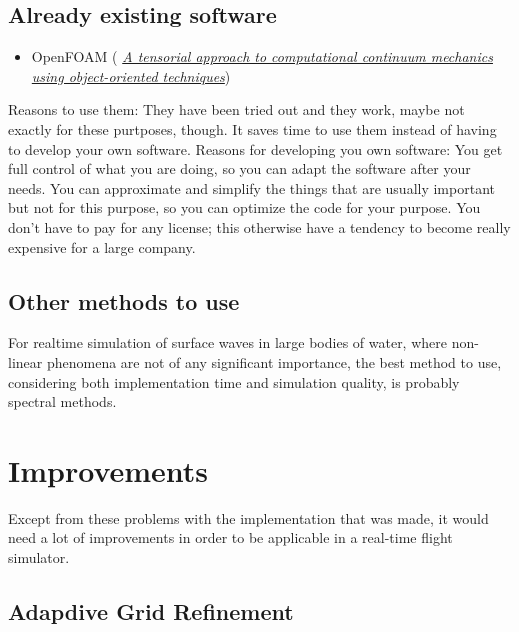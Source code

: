\section{Already existing software}

\begin{itemize}
    \item OpenFOAM ( \textit{\href{http://powerlab.fsb.hr/ped/kturbo/openfoam/docs/foam.pdf}{A tensorial approach to computational continuum mechanics using object-oriented techniques}})
\end{itemize}

Reasons to use them: They have been tried out and they work, maybe not exactly for these purtposes, though. It saves time to use them instead of having to develop your own software. Reasons for developing you own software: You get full control of what you are doing, so you can adapt the software after your needs. You can approximate and simplify the things that are usually important but not for this purpose, so you can optimize the code for your purpose. You don't have to pay for any license; this otherwise have a tendency to become really expensive for a large company.

\section{Other methods to use}

For realtime simulation of surface waves in large bodies of water, where non-linear phenomena are not of any significant importance, the best method to use, considering both implementation time and simulation quality, is probably spectral methods.

\chapter{Improvements}

Except from these problems with the implementation that was made, it would need a lot of improvements in order to be applicable in a real-time flight simulator.

\section{Adapdive Grid Refinement}

